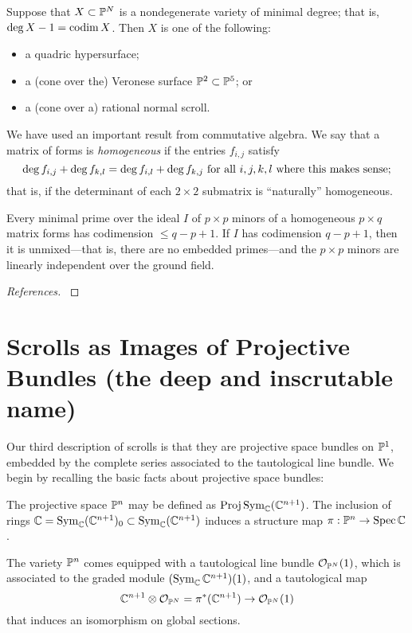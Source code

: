 \begin{fact}
Suppose that $X\subset \PP^{N}$ is a nondegenerate variety of minimal degree; that is, 
$\deg X - 1 = \codim X$. Then $X$ is one of the following:
\begin{itemize}
\item a quadric hypersurface;
\item a (cone over the) Veronese surface $\PP^{2}\subset \PP^{5}$; or
\item a (cone over a) rational normal scroll.
\end{itemize}
\end{fact}


We have used an important result from commutative algebra.
We say that a matrix of forms is \emph{homogeneous} if the entries $f_{i,j}$ satisfy
$$
\deg f_{i,j} + \deg f_{k,l} = \deg f_{i,l}+\deg f_{k,j} \hbox{ for all } i,j,k,l \hbox{ where this makes sense;}
$$
that is, if the determinant of each $2\times 2$ submatrix is ``naturally'' homogeneous.

\begin{fact}\label{Macaulay's Theorem} Every minimal prime over the ideal $I$ of $p\times p$ minors of a homogeneous $p\times q$ matrix forms has codimension $\leq q-p+1$. If $I$ has codimension $q-p+1$, then it is unmixed---that is, there are no embedded primes---and the $p\times p$ minors are linearly independent over the ground field.
\end{fact}

\begin{proof}[References]
\cite[ Theorem *** ]{Ei}
\end{proof}


\section{Scrolls as Images of Projective Bundles (the deep and inscrutable name)}\label{inscrutable name}


 Our third description of scrolls is that they are projective space bundles on $\PP^{1}$, embedded by the complete series associated to the tautological line bundle. We begin by recalling the basic facts about projective space bundles:
 
The projective space $\PP^{n}$ may be defined as $\Proj \Sym_{\CC}(\CC^{n+1})$. The inclusion
of rings $\CC = \Sym_{\CC}(\CC^{n+1})_{0}\subset \Sym_{\CC}(\CC^{n+1})$ induces a structure map
$\pi: \PP^{n}\to \Spec \CC$. 

The variety $\PP^{n}$ comes equipped with a tautological line bundle $\sO_{\PP^{N}}(1)$, which is associated to the graded module $(\Sym_{\CC} \CC^{n+1})(1)$, and a tautological map 
$$
\CC^{n+1}\otimes \sO_{\PP^{N}} =\pi^{*}(\CC^{n+1}) \to \sO_{\PP^{N}}(1)
$$
that induces an isomorphism on global sections.

